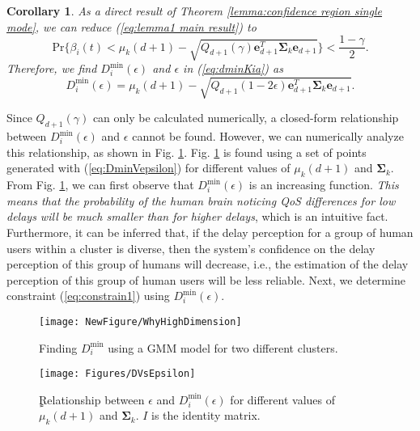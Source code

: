 \documentclass[journal,draftclsnofoot,onecolumn,12pt]{IEEEtran}%
\newtheorem{corollary}{Corollary}
\newcommand{\Sigmab}{\boldsymbol{\Sigma}}
\begin{document}
\begin{corollary}
	As a direct result of Theorem \ref{lemma:confidence region single mode}, we can reduce  (\ref{eq:lemma1 main result}) to
	\begin{equation}\label{eq:Dmin epsilon}
	\text{Pr}\Big\{\beta_i(t)<\mu_k(d+1)-\sqrt{Q_{d+1}(\gamma) \boldsymbol{e}_{d+1}^T\Sigmab_k \boldsymbol{e}_{d+1}}\Big\}<\frac{1-\gamma}{2}.
	\end{equation}
	Therefore, we find $D_i^{\min}(\epsilon)$ and $\epsilon$ in (\ref{eq:dminKia}) as 
	\begin{equation}\label{eq:DminVepsilon}
	D_i^{\min}(\epsilon)=\mu_k(d+1)-\sqrt{Q_{d+1}(1-2\epsilon) \boldsymbol{e}_{d+1}^T\Sigmab_k \boldsymbol{e}_{d+1}}.
	\end{equation}
\end{corollary}


Since $Q_{d+1}(\gamma)$ can only be calculated numerically, a closed-form relationship between $D_i^{\min}(\epsilon)$ and $\epsilon$ cannot be found. However, we can numerically analyze this relationship, as shown in Fig. \ref{fig:Delay versus epsilon}.
{Fig. \ref{fig:Delay versus epsilon} is found using a set of points generated with (\ref{eq:DminVepsilon}) for different values of $\mu_k(d+1)$ and $\Sigmab_k$. } From Fig. \ref{fig:Delay versus epsilon}, we can first observe that $D_i^{\min}(\epsilon)$ is an increasing function. \emph{This means that the probability of the human brain noticing QoS differences for low delays will be much smaller than for higher delays}, which is an intuitive fact. Furthermore, it can be inferred that, if the delay perception for a group of human users within a cluster is diverse, then the system's confidence on the delay perception of this group of humans will decrease, i.e., the estimation of the delay perception of this group of human users will be less reliable. Next, we determine constraint (\ref{eq:constrain1}) using  $D_i^{\min}(\epsilon)$.

	

	\begin{figure}[!t]
    \begin{minipage}{0.49\textwidth}
	\centering
	\texttt{[image: NewFigure/WhyHighDimension]}
	\caption{Finding $D_i^{\min}$ using a GMM model for two different clusters. }
	\label{fig:DuBa}

	\end{minipage}
    \hfill
\begin{minipage}{0.49\textwidth}
	\centering
	\texttt{[image: Figures/DVsEpsilon]}
	\caption{ٍRelationship between $\epsilon$ and $D_i^{\min}(\epsilon)$ for different values of $\mu_k(d+1)$ and $\Sigmab_k$. $I$ is the identity matrix.}
	\label{fig:Delay versus epsilon}

        \end{minipage}
	\end{figure}
\end{document}
